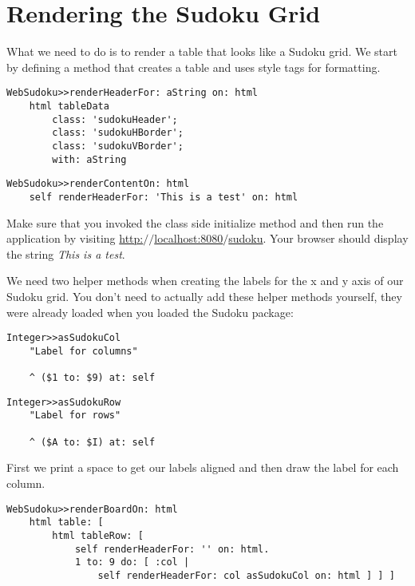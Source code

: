 \documentclass[a4paper,10pt,twoside]{book}
\newcommand{\ct}[1]{{\small\ttfamily\textup{#1}}}
\begin{document}
\section{Rendering the Sudoku Grid}
\label{book:inaction:sudoku:renderinggrid}

What we need to do is to render a table that looks like a Sudoku grid. We start by defining a method that creates a table and uses style tags for formatting.

\begin{lstlisting}
WebSudoku>>renderHeaderFor: aString on: html
    html tableData 
        class: 'sudokuHeader'; 
        class: 'sudokuHBorder';
        class: 'sudokuVBorder'; 
        with: aString
\end{lstlisting}

\begin{lstlisting}
WebSudoku>>renderContentOn: html
    self renderHeaderFor: 'This is a test' on: html
\end{lstlisting}

Make sure that you invoked the class side \ct{initialize} method and then run the application by visiting \href{http://localhost:8080/sudoku}{http:$/$$/$localhost:8080$/$sudoku}. Your browser should display the string \textit{This is a test}.

We need two helper methods when creating the labels for the \ct{x} and \ct{y} axis of our Sudoku grid. You don't need to actually add these helper methods yourself, they were already loaded when you loaded the Sudoku package:

\begin{lstlisting}
Integer>>asSudokuCol
    "Label for columns"

    ^ ($1 to: $9) at: self
\end{lstlisting}

\begin{lstlisting}
Integer>>asSudokuRow
    "Label for rows"

    ^ ($A to: $I) at: self
\end{lstlisting}

First we print a space to get our labels aligned and then draw the label for each column.

\begin{lstlisting}
WebSudoku>>renderBoardOn: html
    html table: [ 
        html tableRow: [
            self renderHeaderFor: '' on: html.
            1 to: 9 do: [ :col | 
                self renderHeaderFor: col asSudokuCol on: html ] ] ]
\end{lstlisting}
\end{document}
